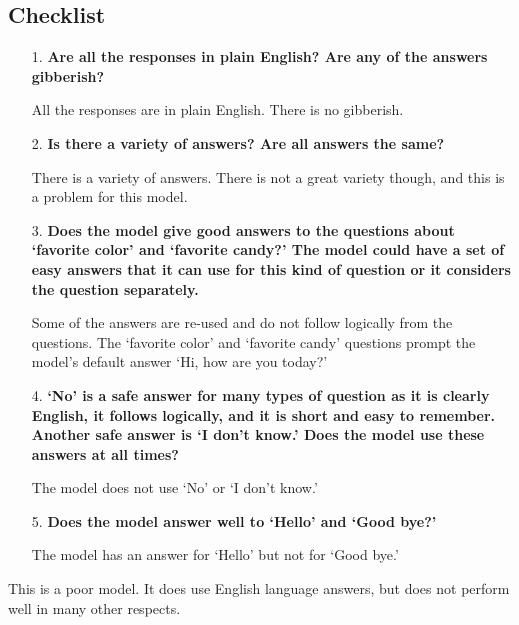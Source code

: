 \subsection{Checklist}

\begin{itemize}
	\item [1.] \textbf{Are all the responses in plain English? Are any of the answers gibberish?}
	
	\item []All the responses are in plain English. There is no gibberish.
	
	\item [2.] \textbf{Is there a  variety of answers? Are all answers the same?}
	
	\item []There is a variety of answers. There is not a great variety though, and this is a problem for this model.
	
	\item [3.] \textbf{Does the model give good answers to the questions about `favorite color' and `favorite candy?' The model could have a set of easy answers that it can use for this kind of question or it considers the question separately.} 
	
	\item []Some of the answers are re-used and do not follow logically from the questions. The `favorite color' and `favorite candy' questions prompt the model's default answer `Hi, how are you today?' 
	
	\item [4.] \textbf{`No' is a safe answer for many types of question as it is clearly English, it follows logically, and it is short and easy to remember. Another safe answer is `I don't know.' Does the model use these answers at all times?}
	
	\item []The model does not use `No' or `I don't know.'
	
	\item [5.] \textbf{Does the model answer well to `Hello' and `Good bye?'}
	
	\item []The model has an answer for `Hello' but not for `Good bye.'
	
\end{itemize}

This is a poor model. It does use English language answers, but does not perform well in many other respects.

